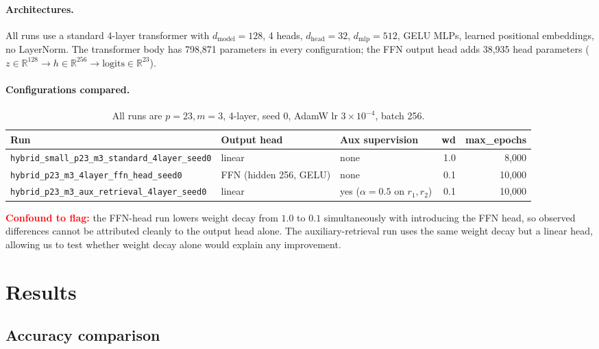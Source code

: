 \documentclass[10pt]{article}
\begin{document}
\paragraph{Architectures.}
All runs use a standard 4-layer transformer with $d_\text{model}=128$, 4 heads, $d_\text{head}=32$, $d_\text{mlp}=512$, GELU MLPs, learned positional embeddings, no LayerNorm. The transformer body has 798{,}871 parameters in every configuration; the FFN output head adds 38{,}935 head parameters ($z \in \mathbb{R}^{128} \to h \in \mathbb{R}^{256} \to \mathrm{logits} \in \mathbb{R}^{23}$).

\paragraph{Configurations compared.}

\begin{table}[h]
\centering
\caption{All runs are $p=23, m=3$, 4-layer, seed 0, AdamW lr $3\!\times\!10^{-4}$, batch 256.}
\label{tab:setup}
\small
\begin{tabular}{lllrr}
\toprule
Run & Output head & Aux supervision & wd & max\_epochs \\
\midrule
\texttt{hybrid\_small\_p23\_m3\_standard\_4layer\_seed0} & linear & none & 1.0 & 8{,}000 \\
\texttt{hybrid\_p23\_m3\_4layer\_ffn\_head\_seed0}        & FFN (hidden 256, GELU) & none & 0.1 & 10{,}000 \\
\texttt{hybrid\_p23\_m3\_aux\_retrieval\_4layer\_seed0}   & linear & yes ($\alpha\!=\!0.5$ on $r_1, r_2$) & 0.1 & 10{,}000 \\
\bottomrule
\end{tabular}
\end{table}

\textcolor{red}{\textbf{Confound to flag:}} the FFN-head run lowers weight decay from $1.0$ to $0.1$ simultaneously with introducing the FFN head, so observed differences cannot be attributed cleanly to the output head alone. The auxiliary-retrieval run uses the same weight decay but a linear head, allowing us to test whether weight decay alone would explain any improvement.

\section{Results}

\subsection{Accuracy comparison}
\end{document}
